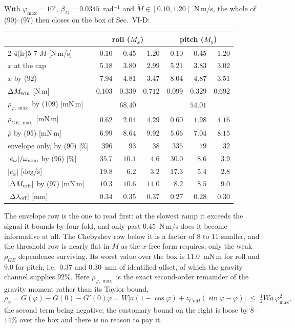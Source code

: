 \documentclass[10pt]{article}
\begin{document}
With $\varphi_{\max} = 10^\circ$, $\beta_M = 0.0345$~rad$^{-1}$ and
$\dot M\in[0.10,1.20]$~N\,m/s, the whole of (90)--(97) then closes on
the box of Sec.~VI-D:
\begin{center}\small
\setlength{\tabcolsep}{5pt}
\begin{tabular}{@{}lrrrrrr@{}}
\toprule
 & \multicolumn{3}{c}{roll ($M_x$)} & \multicolumn{3}{c}{pitch ($M_y$)}\\
\cmidrule(lr){2-4}\cmidrule(lr){5-7}
$\dot M$ [N\,m/s] & $0.10$ & $0.45$ & $1.20$ & $0.10$ & $0.45$ & $1.20$\\
\midrule
$x$ at the cap                  & $5.18$ & $3.80$ & $2.99$ & $5.21$ & $3.83$ & $3.02$\\
$\bar x$ by (92)                & $7.94$ & $4.81$ & $3.47$ & $8.04$ & $4.87$ & $3.51$\\
$\Delta M_{\rm win}$ [N\,m]     & $0.103$& $0.339$& $0.712$& $0.099$& $0.329$& $0.692$\\
$\rho_{\varphi,\max}$ by (109) [mN\,m] & \multicolumn{3}{c}{$68.40$} & \multicolumn{3}{c}{$54.01$}\\
$\rho_{GE,\max}$ [mN\,m]        & $0.62$ & $2.04$ & $4.29$ & $0.60$ & $1.98$ & $4.16$\\
$\bar\rho$ by (95) [mN\,m]      & $6.99$ & $8.64$ & $9.92$ & $5.66$ & $7.04$ & $8.15$\\
\midrule
envelope only, by (90) [\%]     & $396$  & $93$   & $38$   & $335$  & $79$   & $32$\\
$|e_\omega|/\omega_{\rm nom}$ by (96) [\%] & $35.7$ & $10.1$ & $4.6$ & $30.0$ & $8.6$ & $3.9$\\
$|e_\omega|$ [deg/s]            & $19.8$ & $6.2$  & $3.2$  & $17.3$ & $5.4$ & $2.8$\\
$|\Delta M_{\rm crit}|$ by (97) [mN\,m] & $10.3$ & $10.6$ & $11.0$ & $8.2$ & $8.5$ & $9.0$\\
$|\Delta\lambda_{\rm off}|$ [mm] & $0.34$ & $0.35$ & $0.37$ & $0.27$ & $0.28$ & $0.30$\\
\bottomrule
\end{tabular}
\end{center}
The envelope row is the one to read first: at the slowest ramp it
exceeds the signal it bounds by four-fold, and only past
$0.45$~N\,m/s does it become informative at all. The Chebyshev row
below it is a factor of $8$ to $11$ smaller, and the threshold row is
nearly flat in $\dot M$ as the $x$-free form requires, only the weak
$\rho_{GE}$ dependence surviving. Its worst value over the box is
$11.0$~mN\,m for roll and $9.0$ for pitch, i.e.\ $0.37$ and $0.30$~mm
of identified offset, of which the gravity channel supplies $92\%$.
Here $\rho_{\varphi,\max}$ is the exact second-order remainder of the
gravity moment rather than its Taylor bound,
\begin{equation}
  \rho_\varphi = G(\varphi)-G(0)-G'(0)\varphi
  = W\bigl[a(1-\cos\varphi) + z_{CoM}(\sin\varphi-\varphi)\bigr]
  \;\le\; \tfrac12 W a\,\varphi_{\max}^2 ,
  \tag{109}
\end{equation}
the second term being negative; the customary bound on the right is
loose by $8$--$14\%$ over the box and there is no reason to pay it.
\end{document}

